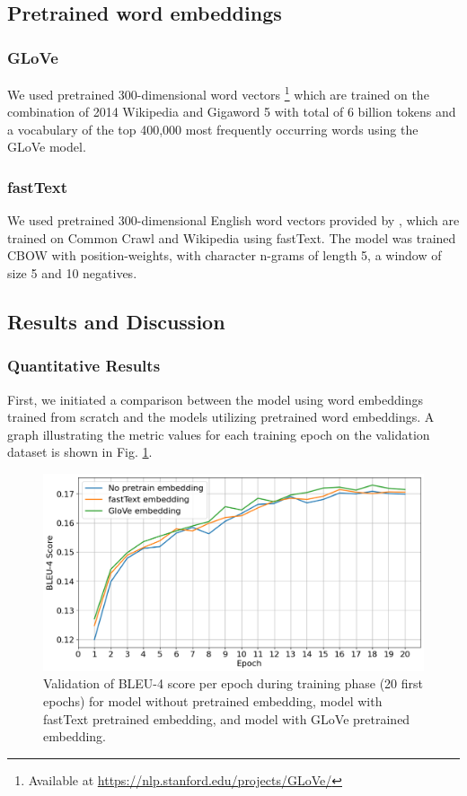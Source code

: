 \documentclass[conference]{IEEEtran}
\begin{document}
\subsection{Pretrained word embeddings}
\subsubsection{GLoVe}We used pretrained 300-dimensional word vectors \footnote{Available at \url{https://nlp.stanford.edu/projects/GLoVe/}} which are trained on the combination of 2014 Wikipedia and Gigaword 5 with total of 6 billion tokens and a vocabulary of the top 400,000 most frequently occurring words using the GLoVe model\cite{pennington2014GLoVe}. 
\subsubsection{fastText}We used pretrained 300-dimensional English word vectors provided by \cite{grave2018learning}, which are trained on Common Crawl and Wikipedia using fastText. The model was trained CBOW with position-weights, with character n-grams of length 5, a window of size 5 and 10 negatives. 


\subsection{Results and Discussion\label{res}}

\subsubsection{Quantitative Results} \hfill %

First, we initiated a comparison between the model using word embeddings trained from scratch and the models utilizing pretrained word embeddings. A graph illustrating the metric values for each training epoch on the validation dataset is shown in Fig. \ref{fig:compare_val_score}.

\begin{figure}[h]
    \centering
\includegraphics[width=\columnwidth]{assets/metric_compare_train_phase.png}
\caption{Validation of BLEU-4 score per epoch during training phase (20 first epochs) for model without pretrained embedding, model with fastText pretrained embedding, and model with GLoVe pretrained embedding.}
\label{fig:compare_val_score}
\end{figure}
\end{document}
